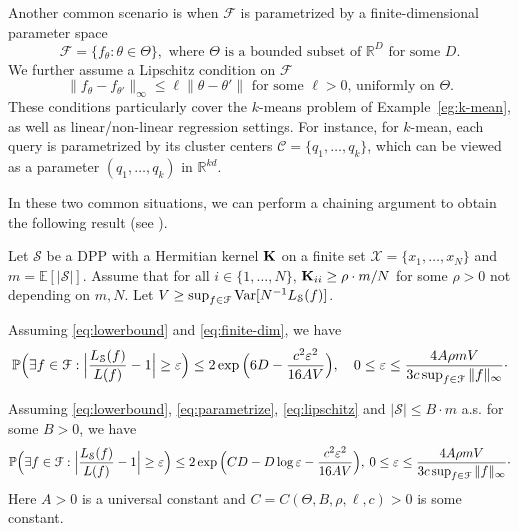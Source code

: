 Another common scenario is when $\mathcal F$ is parametrized by a finite-dimensional parameter space
\begin{equation} \tag{A.2} \label{eq:parametrize}
    \mathcal F = \{f_\theta: \theta \in \Theta\}, \text{ where $\Theta$ is a bounded subset of $\mathbb R^D$ for some $D$}.
\end{equation}
We further assume a Lipschitz condition on $\mathcal F$
\begin{equation} \tag{A.3} \label{eq:lipschitz}
   \|f_{\theta} - f_{\theta'}\|_\infty \le \ell \|\theta - \theta'\| \text{ for some $\ell>0$, uniformly on $\Theta$.}
\end{equation}
These conditions particularly cover the $k$-means problem of Example~\ref{eg:k-mean}, as well as linear/non-linear regression settings. 
For instance, for $k$-mean, each query is parametrized by its cluster centers $\mathcal C= \{q_1,\ldots,q_k\}$, which can be viewed as a parameter $(q_1,\ldots,q_k)$ in $ \mathbb R^{kd}$.  

In these two common situations, we can perform a chaining argument to obtain the following result (see \cite{NIPS2024}).

\begin{theorem}\label{t:core-union}
    Let $\mathcal S$ be a DPP with a Hermitian kernel $\mathbf{K}$ on a finite set $\mathcal X = \{x_1, \dots, x_N\}$ and $m = \mathbb E[|\mathcal S|]$. Assume that for all $i\in\{1, \dots, N\}$, $\mathbf{K}_{ii} \ge \rho \cdot m/N$ for some $\rho> 0$ not depending on $m,N$. 
    Let $V\ge \sup_{f\in \mathcal F} {\mathop{\mathrm{Var}}\nolimits}[N^{-1} L_{\mathcal S}(f)]$. 
    \medskip
    
    Assuming \eqref{eq:lowerbound} and \eqref{eq:finite-dim}, we have
   \[\mathbb P
   \Big ( \exists f \in \mathcal F: 
  \Big |\frac{ L_{\mathcal S}(f)}{L(f)}-1 \Big | \ge \varepsilon \Big ) \le 2 \exp \Big (6D - {c^2 \varepsilon^2 \over 16 AV} \Big ), \quad 0 \le  \varepsilon \le  {4A\rho m V \over 3c \sup_{f\in \mathcal F}\|f\|_\infty} \cdot \]

  Assuming \eqref{eq:lowerbound}, \eqref{eq:parametrize}, \eqref{eq:lipschitz} and $|\mathcal S| \le B \cdot m$ a.s. for some $B>0$, we have
   \[\mathbb P
   \Big ( \exists f \in \mathcal F: 
  \Big |\frac{L_{\mathcal S}(f)}{L(f)}-1 \Big | \ge \varepsilon \Big ) \le  2 \exp \Big (CD- D\log \varepsilon - {c^2 \varepsilon^2 \over 16 AV}\Big ), \: 0 \le  \varepsilon \le  {4A\rho mV \over 3c \sup_{f\in \mathcal F}\|f\|_\infty} \cdot \]
  Here $A>0$ is a universal constant and $C=C(\Theta, B,\rho,\ell, c)>0$ is some constant.
\end{theorem}


